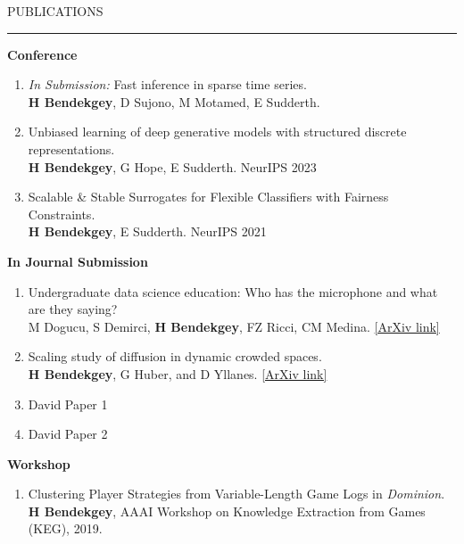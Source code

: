 \documentclass{resume} %
\renewenvironment{rSection}[1]{
\sectionskip
\textcolor{CarnegieMellonRed}{\MakeUppercase{#1}}
\sectionlineskip
\hrule
\begin{list}{}{
\setlength{\leftmargin}{1.5em}
}
\item[]
}{
\end{list}
}
\begin{document}
\begin{rSection}{Publications} \itemsep -2pt
{\bf Conference}
\begin{enumerate}
	\item {\em In Submission:} Fast inference in sparse time series.\\
		{\bf H Bendekgey}, D Sujono, M Motamed, E Sudderth.

	\item Unbiased learning of deep generative models with structured discrete
representations.\\
		{\bf H Bendekgey}, G Hope, E Sudderth. NeurIPS 2023
	\item Scalable \& Stable Surrogates for Flexible Classifiers with Fairness Constraints.\\
		{\bf H Bendekgey}, E Sudderth. NeurIPS 2021
\end{enumerate}
\vspace{1.0em}
{\bf In Journal Submission}
\begin{enumerate}
	\item Undergraduate data science education: Who has the microphone and what are they saying?\\
		M Dogucu, S Demirci, {\bf H Bendekgey}, FZ Ricci, CM Medina. \href{https://arxiv.org/abs/2403.03387}{[ArXiv link]}
	\item Scaling study of diffusion in dynamic crowded spaces.\\
	      {\bf H Bendekgey}, G Huber, and D Yllanes. \href{https://arxiv.org/abs/2011.02444}{[ArXiv link]}
	\item David Paper 1
	\item David Paper 2
\end{enumerate}

{\bf Workshop}
\begin{enumerate}
	\item Clustering Player Strategies from Variable-Length Game Logs in {\em Dominion}.\\
		{\bf H Bendekgey}, AAAI Workshop on Knowledge Extraction from Games (KEG), 2019.
\end{enumerate}\vspace{1.em}

\end{rSection}
\end{document}

